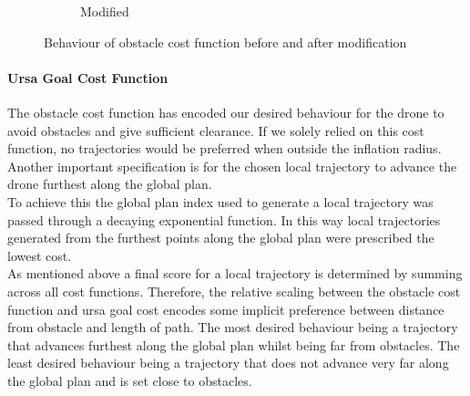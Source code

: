 \documentclass[capstone_report.tex]{subfiles}
\begin{document}
\begin{figure}[H]
\begin{subfigure}{0.5\textwidth}
        \caption{Modified}
        \label{fig:ocf_mod}
    \end{subfigure}
    \caption{Behaviour of obstacle cost function before and after modification}\label{fig:ocf_comp}
\end{figure}

\paragraph{Ursa Goal Cost Function}
The obstacle cost function has encoded our desired behaviour for the drone to avoid obstacles and give sufficient clearance.  If we solely relied on this cost function, no trajectories would be preferred when outside the inflation radius.
Another important specification is for the chosen local trajectory to advance the drone furthest along the global plan.\\

To achieve this the global plan index used to generate a local trajectory was passed through a decaying exponential function.  In this way local trajectories generated from the furthest points along the global plan were prescribed the lowest cost.  \\



As mentioned above a final score for a local trajectory is determined by summing across all cost functions.  Therefore, the relative scaling between the obstacle cost function and ursa goal cost encodes some implicit preference between distance from obstacle and length of path.  The most desired behaviour being a trajectory that advances furthest along the global plan whilst being far from obstacles.  The least desired behaviour being a trajectory that does not advance very far along the global plan and is set close to obstacles.\\
\end{document}
